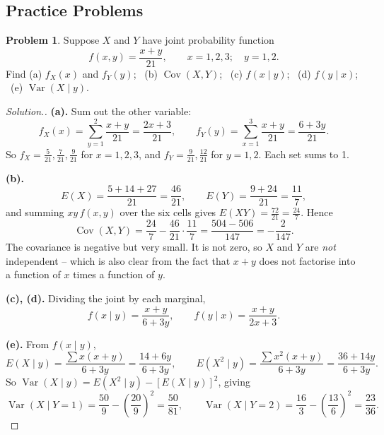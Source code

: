 \documentclass[12pt,a4paper]{report}
\theoremstyle{definition}
\theoremstyle{plain}
\theoremstyle{definition}
\newtheorem{problemx}{Problem}[section]
\newenvironment{problem}{\begin{problemx}}{\end{problemx}}
\newenvironment{solution}
  {\renewcommand{\qedsymbol}{}\begin{proof}[\textit{Solution}.]}
  {\end{proof}}
\begin{document}
 
       























\subsection{Practice Problems}

\begin{problem}
Suppose $X$ and $Y$ have joint probability function
\[f(x,y) = \frac{x+y}{21},\qquad x = 1,2,3;\quad y = 1,2.\]
Find (a) $f_X(x)$ and $f_Y(y)$; \, (b) $\operatorname{Cov}(X,Y)$; \, (c) $f(x\mid y)$; \,
(d) $f(y\mid x)$; \, (e) $\operatorname{Var}(X\mid y)$.
\end{problem}

\begin{solution}
\textbf{(a).} Sum out the other variable:
\[f_X(x) = \sum_{y=1}^{2}\frac{x+y}{21} = \frac{2x+3}{21},\qquad
f_Y(y) = \sum_{x=1}^{3}\frac{x+y}{21} = \frac{6+3y}{21}.\]
So $f_X = \tfrac{5}{21},\tfrac{7}{21},\tfrac{9}{21}$ for $x=1,2,3$, and
$f_Y = \tfrac{9}{21},\tfrac{12}{21}$ for $y=1,2$. Each set sums to 1.

\textbf{(b).}
\[E(X) = \frac{5+14+27}{21} = \frac{46}{21},\qquad
E(Y) = \frac{9+24}{21} = \frac{11}{7},\]
and summing $xy\,f(x,y)$ over the six cells gives $E(XY) = \tfrac{72}{21} = \tfrac{24}{7}$.
Hence
\[\operatorname{Cov}(X,Y) = \frac{24}{7}-\frac{46}{21}\cdot\frac{11}{7}
 = \frac{504-506}{147} = -\frac{2}{147}.\]
The covariance is negative but very small. It is not zero, so $X$ and $Y$ are
\emph{not} independent -- which is also clear from the fact that $x+y$ does not factorise
into a function of $x$ times a function of $y$.

\textbf{(c), (d).} Dividing the joint by each marginal,
\[f(x\mid y) = \frac{x+y}{6+3y},\qquad f(y\mid x) = \frac{x+y}{2x+3}.\]

\textbf{(e).} From $f(x\mid y)$,
\[E(X\mid y) = \frac{\sum x(x+y)}{6+3y} = \frac{14+6y}{6+3y},\qquad
E(X^{2}\mid y) = \frac{\sum x^{2}(x+y)}{6+3y} = \frac{36+14y}{6+3y}.\]
So $\operatorname{Var}(X\mid y) = E(X^{2}\mid y)-\left[E(X\mid y)\right]^{2}$, giving
\[\operatorname{Var}(X\mid Y=1) = \frac{50}{9}-\left(\frac{20}{9}\right)^{2} = \frac{50}{81},
\qquad
\operatorname{Var}(X\mid Y=2) = \frac{16}{3}-\left(\frac{13}{6}\right)^{2} = \frac{23}{36}.\]
\end{solution}
\end{document}
